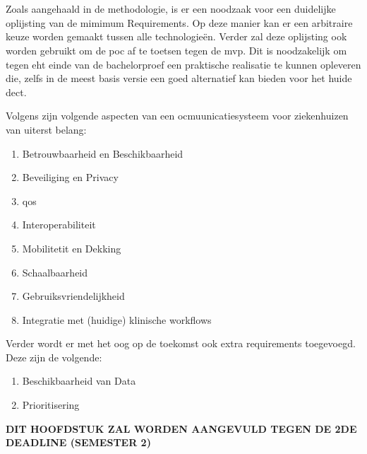 \chapter{}%
\label{ch:minReq}

Zoals aangehaald in de methodologie, is er een noodzaak voor een duidelijke oplijsting van de mimimum Requirements. Op deze manier kan er een arbitraire keuze worden gemaakt tussen alle technologieën. Verder zal deze oplijsting ook worden gebruikt om de \acrshort{poc} af te toetsen tegen de \acrshort{mvp}. Dit is noodzakelijk om tegen eht einde van de bachelorproef een praktische realisatie te kunnen opleveren die, zelfs in de meest basis versie een goed alternatief kan bieden voor het huide \acrshort{dect}.

Volgens \textcite{Coiera2006} zijn volgende aspecten van een ocmuunicatiesysteem voor ziekenhuizen van uiterst belang:

\begin{enumerate}
    \item Betrouwbaarheid en Beschikbaarheid
    \item Beveiliging en Privacy
    \item \acrfull{qos}
    \item Interoperabiliteit
    \item Mobilitetit en Dekking
    \item Schaalbaarheid
    \item Gebruiksvriendelijkheid
    \item Integratie met (huidige) klinische workflows 
\end{enumerate}

Verder wordt er met het oog op de toekomst ook extra requirements toegevoegd. Deze zijn de volgende:

\begin{enumerate}
    \item Beschikbaarheid van Data
    \item Prioritisering
\end{enumerate}

\textbf{DIT HOOFDSTUK ZAL WORDEN AANGEVULD TEGEN DE 2DE DEADLINE (SEMESTER 2)}

\section{}
\label{sec:betrouwbaarheid-en-beschikbaarheid}


